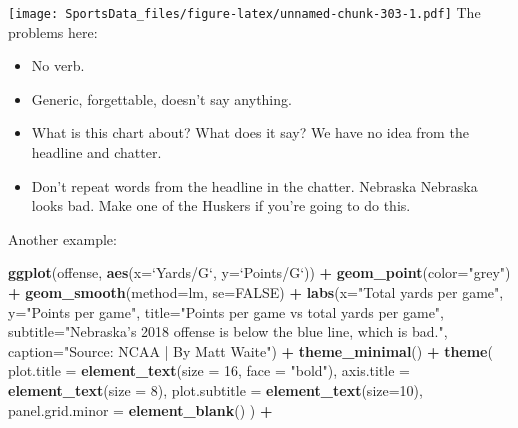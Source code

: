 \documentclass[
]{book}
\newenvironment{Shaded}{\begin{snugshade}}{\end{snugshade}}
\newcommand{\DataTypeTok}[1]{\textcolor[rgb]{0.13,0.29,0.53}{#1}}
\newcommand{\DecValTok}[1]{\textcolor[rgb]{0.00,0.00,0.81}{#1}}
\newcommand{\KeywordTok}[1]{\textcolor[rgb]{0.13,0.29,0.53}{\textbf{#1}}}
\newcommand{\NormalTok}[1]{#1}
\newcommand{\OperatorTok}[1]{\textcolor[rgb]{0.81,0.36,0.00}{\textbf{#1}}}
\newcommand{\OtherTok}[1]{\textcolor[rgb]{0.56,0.35,0.01}{#1}}
\newcommand{\StringTok}[1]{\textcolor[rgb]{0.31,0.60,0.02}{#1}}
\providecommand{\tightlist}{%
  \setlength{\itemsep}{0pt}\setlength{\parskip}{0pt}}
\begin{document}
\texttt{[image: SportsData\_files/figure-latex/unnamed-chunk-303-1.pdf]}
The problems here:

\begin{itemize}
\tightlist
\item
  No verb.
\item
  Generic, forgettable, doesn't say anything.
\item
  What is this chart about? What does it say? We have no idea from the headline and chatter.
\item
  Don't repeat words from the headline in the chatter. Nebraska Nebraska looks bad. Make one of the Huskers if you're going to do this.
\end{itemize}

Another example:

\begin{Shaded}
\begin{Highlighting}[]
\KeywordTok{ggplot}\NormalTok{(offense, }\KeywordTok{aes}\NormalTok{(}\DataTypeTok{x=}\StringTok{`}\DataTypeTok{Yards/G}\StringTok{`}\NormalTok{, }\DataTypeTok{y=}\StringTok{`}\DataTypeTok{Points/G}\StringTok{`}\NormalTok{)) }\OperatorTok{+}\StringTok{ }
\StringTok{  }\KeywordTok{geom_point}\NormalTok{(}\DataTypeTok{color=}\StringTok{"grey"}\NormalTok{) }\OperatorTok{+}\StringTok{ }\KeywordTok{geom_smooth}\NormalTok{(}\DataTypeTok{method=}\NormalTok{lm, }\DataTypeTok{se=}\OtherTok{FALSE}\NormalTok{) }\OperatorTok{+}\StringTok{ }
\StringTok{  }\KeywordTok{labs}\NormalTok{(}\DataTypeTok{x=}\StringTok{"Total yards per game"}\NormalTok{, }\DataTypeTok{y=}\StringTok{"Points per game"}\NormalTok{, }\DataTypeTok{title=}\StringTok{"Points per game vs total yards per game"}\NormalTok{, }\DataTypeTok{subtitle=}\StringTok{"Nebraska's 2018 offense is below the blue line, which is bad."}\NormalTok{, }\DataTypeTok{caption=}\StringTok{"Source: NCAA | By Matt Waite"}\NormalTok{) }\OperatorTok{+}\StringTok{ }
\StringTok{  }\KeywordTok{theme_minimal}\NormalTok{() }\OperatorTok{+}\StringTok{ }
\StringTok{  }\KeywordTok{theme}\NormalTok{(}
    \DataTypeTok{plot.title =} \KeywordTok{element_text}\NormalTok{(}\DataTypeTok{size =} \DecValTok{16}\NormalTok{, }\DataTypeTok{face =} \StringTok{"bold"}\NormalTok{),}
    \DataTypeTok{axis.title =} \KeywordTok{element_text}\NormalTok{(}\DataTypeTok{size =} \DecValTok{8}\NormalTok{), }
    \DataTypeTok{plot.subtitle =} \KeywordTok{element_text}\NormalTok{(}\DataTypeTok{size=}\DecValTok{10}\NormalTok{), }
    \DataTypeTok{panel.grid.minor =} \KeywordTok{element_blank}\NormalTok{()}
\NormalTok{    ) }\OperatorTok{+}

\end{Highlighting}
\end{Shaded}
\end{document}
